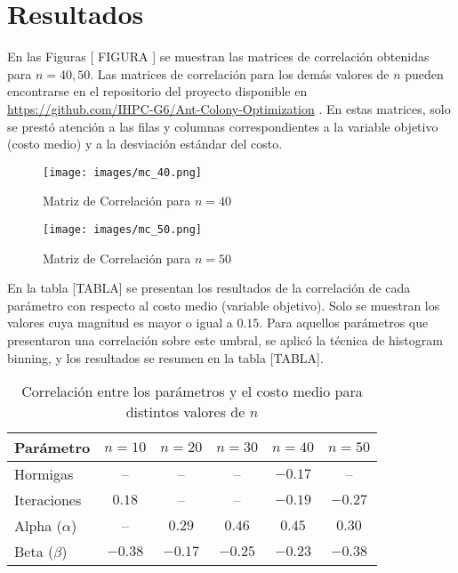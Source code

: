 \documentclass[conference]{IEEEtran}
\begin{document}
\section{Resultados}
En las Figuras [ FIGURA ] se muestran las matrices de correlación obtenidas para $n=40,50$. Las matrices de correlación para los demás valores de $n$ pueden encontrarse en el repositorio del proyecto disponible en \url{https://github.com/IHPC-G6/Ant-Colony-Optimization} . En estas matrices, solo se prestó atención a las filas y columnas correspondientes a la variable objetivo (costo medio) y a la desviación estándar del costo.

    \begin{figure}[htbp]
      \centering
      \begin{minipage}[t]{0.45\linewidth}
        \centering
        \texttt{[image: images/mc\_40.png]}
        \caption{Matriz de Correlación para $n=40$}
        \label{fig:image29}
      \end{minipage}
      \hfill
      \begin{minipage}[t]{0.45\linewidth}
        \centering
        \texttt{[image: images/mc\_50.png]}
        \caption{Matriz de Correlación para $n=50$}
        \label{fig:image30}
      \end{minipage}
    \end{figure}

En la tabla [TABLA] se presentan los resultados de la correlación de cada parámetro con respecto al costo medio (variable objetivo). Solo se muestran los valores cuya magnitud es mayor o igual a $0.15$. Para aquellos parámetros que presentaron una correlación sobre este umbral, se aplicó la técnica de histogram binning, y los resultados se resumen en la tabla [TABLA].

\begin{table}[h]
\centering
\begin{tabular}{|l|c|c|c|c|c|}
\hline
Parámetro & $n=10$ & $n=20$ & $n=30$ & $n=40$ & $n=50$ \\
\hline
Hormigas & -- & -- & -- & $-0.17$ & -- \\
\hline
Iteraciones & $0.18$ & -- & -- & $-0.19$ & $-0.27$ \\
\hline
Alpha ($\alpha$) & -- & $0.29$ & $0.46$ & $0.45$ & $0.30$ \\
\hline
Beta ($\beta$) & $-0.38$ & $-0.17$ & $-0.25$ & $-0.23$ & $-0.38$ \\
\hline
\end{tabular}
\caption{Correlación entre los parámetros y el costo medio para distintos valores de $n$}
\label{tab:table2}
\end{table}
\end{document}
